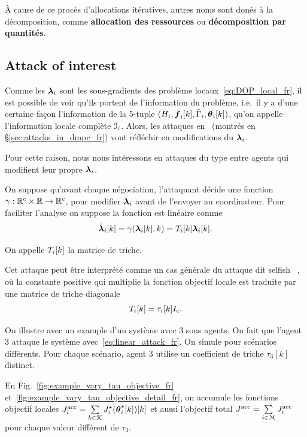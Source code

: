 \documentclass[../main.tex]{subfiles}
\begin{document}
À cause de ce procès d'allocations itératives, autres noms sont donés à la décomposition, comme \textbf{allocation des ressources} ou \textbf{décomposition par quantités}.

\subsection{Attack of interest}\label{sec:attack-interest_fr}

Comme les $\boldsymbol{\lambda}_{i}$ sont les sous-gradients des problème locaux~\eqref{eq:DOP_local_fr}, il est possible de voir qu'ils portent de l'information du problème, i.e.\ il y a d'une certaine façon l'information de la $5$-tuple $(H_{i},\vec{f}_{i}[k],\bar{\Gamma}_{i},\thetaik)$, qu'on appelle l'information locale complète $\mathcal{I}_{i}$.
Alors, les attaques en~\cite{VelardeEtAl2018} (montrés en \S\ref{sec:attacks_in_dmpc_fr}) vont réfléchir en modifications du $\boldsymbol{\lambda}_{i}$.

Pour cette raison, nous nous intéressons en attaques du type \fdi{} entre agents qui modifient leur propre $\boldsymbol{\lambda}_{i}$.

On suppose qu'avant chaque négociation, l'attaquant décide une fonction ${\gamma:\mathbb{R}^{c}\times\mathbb{R}\to \mathbb{R}^{c}}$, pour modifier $\boldsymbol{\lambda}_{i}$ avant de l'envoyer au coordinateur.
Pour faciliter l'analyse on suppose la fonction est linéaire comme
\begin{equation}
  \label{eq:linear_attack_fr}
  \lambdaicheat[k]=\gamma(\lambdaik,k)=\Tik\lambdaik.
\end{equation}

On appelle $T_{i}[k]$ la matrice de triche.

Cet attaque peut être interprété comme un cas générale du attaque dit selfish ~\cite{VelardeEtAl2018},
où la constante positive qui multiplie la fonction objectif locale est traduite par une matrice de triche diagonale
\begin{equation}
  \label{eq:selfish_attack}
  T_{i}[k]=\tau_{i}[k] I_{c}.
\end{equation}

On illustre avec un example d'un système avec $3$ sous agents.
On fait que l'agent $3$ attaque le système avec~\eqref{eq:linear_attack_fr}.
On simule pour scénarios différents.
Pour chaque scénario, agent $3$ utilise un coefficient de triche $\tau_{3}[k]$ distinct.

En Fig.~\ref{fig:example_vary_tau_objective_fr} et~\ref{fig:example_vary_tau_objective_detail_fr}, on accumule les fonctions objectif locales ${J_{i}^{\text{acc}}=\sum\limits_{k\in\mathcal{K}}J_{i}^{\star}(\boldsymbol{\theta}_i^{\star}[k])[k]}$
et aussi l'objectif total ${J^{\text{acc}}=\sum\limits_{i\in\mathcal{M}}J_{i}^{\text{acc}}}$ pour chaque valeur différent de $\tau_{3}$.
\end{document}
